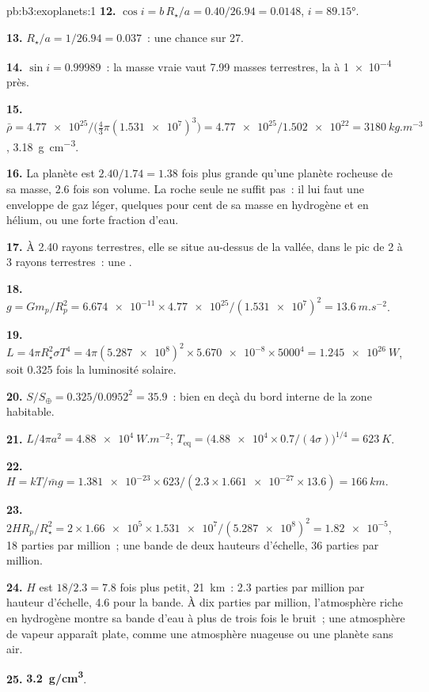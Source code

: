 \begin{solution}{pb:b3:exoplanets:1}
\textbf{12.} $\cos i = b\,R_\star/a = 0.40/26.94 = 0.0148$, $i = \ang{89.15}$.

\textbf{13.} $R_\star/a = 1/26.94 = 0.037$~: une chance sur 27.

\textbf{14.} $\sin i = 0.99989$~: la masse vraie vaut 7.99 masses terrestres, la  à \num{1e-4} près.

\textbf{15.} $\bar\rho = \num{4.77e25}/\bigl(\tfrac43\pi(\num{1.531e7})^3\bigr) =
\num{4.77e25}/\num{1.502e22} = \qty{3180}{kg.m^{-3}}$,
\qty{3.18}{g.cm^{-3}}.

\textbf{16.} La planète est $2.40/1.74 = 1.38$ fois plus grande qu'une planète rocheuse
de sa masse, 2.6 fois son volume. La roche seule ne suffit pas~: il lui faut
une enveloppe de gaz léger, quelques pour cent de sa masse en hydrogène et en hélium,
ou une forte fraction d'eau.

\textbf{17.} À 2.40 rayons terrestres, elle se situe au-dessus de la vallée, dans le
pic de 2 à 3 rayons terrestres~: une .

\textbf{18.} $g = Gm_p/R_p^2 = \num{6.674e-11}\times\num{4.77e25}/(\num{1.531e7})^2 =
\qty{13.6}{m.s^{-2}}$.

\textbf{19.} $L = 4\pi R_\star^2\sigma T^4 = 4\pi(\num{5.287e8})^2\times\num{5.670e-8}
\times5000^4 = \qty{1.245e26}{W}$, soit 0.325 fois la luminosité solaire.

\textbf{20.} $S/S_\oplus = 0.325/0.0952^2 = 35.9$~: bien en deçà du bord interne de
la zone habitable.

\textbf{21.} $L/4\pi a^2 = \qty{4.88e4}{W.m^{-2}}$; $T_\mathrm{eq} =
\bigl(\num{4.88e4}\times0.7/(4\sigma)\bigr)^{1/4} = \qty{623}{K}$.

\textbf{22.} $H = kT/\bar m g = \num{1.381e-23}\times623/(2.3\times\num{1.661e-27}
\times13.6) = \qty{166}{km}$.

\textbf{23.} $2HR_p/R_\star^2 = 2\times\num{1.66e5}\times\num{1.531e7}/
(\num{5.287e8})^2 = \num{1.82e-5}$, 18 parties par million~; une bande de deux
hauteurs d'échelle, 36 parties par million.

\textbf{24.} $H$ est $18/2.3 = 7.8$ fois plus petit, \qty{21}{km}~: 2.3 parties par
million par hauteur d'échelle, 4.6 pour la bande. À dix parties par million,
l'atmosphère riche en hydrogène montre sa bande d'eau à plus de trois fois le bruit~;
une atmosphère de vapeur apparaît plate, comme une atmosphère nuageuse ou une planète
sans air.

\textbf{25.} \textbf{\qty[text-series-to-math=true]{3.2}{g/cm^3}}.
\end{solution}
